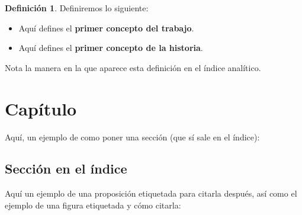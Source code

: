 \documentclass[12pt]{book}%
\theoremstyle{definition}%
\newtheorem{df}{Definición}[chapter]
\begin{document}
\begin{df} Definiremos lo siguiente:
\begin{itemize}
\item Aquí defines el \textbf{primer concepto del trabajo}.
\item Aquí defines el \textbf{primer concepto de la historia}.
\end{itemize}
\end{df}

Nota la manera en la que aparece esta definición en el índice analítico.


\chapter{Capítulo}

Aquí, un ejemplo de como poner una sección (que sí sale en el índice):


\section{Sección en el índice}

Aquí un ejemplo de una proposición etiquetada para citarla después, así como el ejemplo de una figura etiquetada y cómo citarla:
\end{document}
